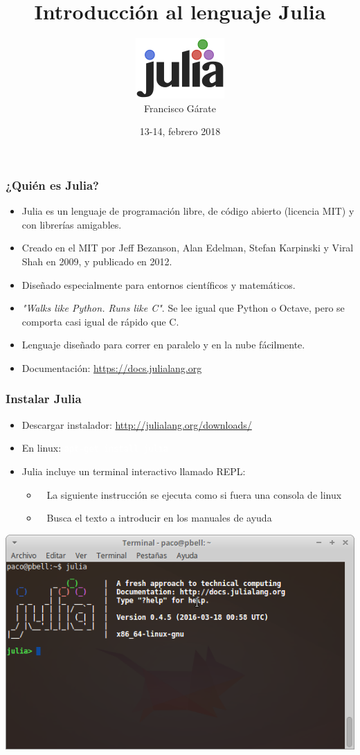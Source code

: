 \documentclass{beamer}
\title{Introducción al lenguaje Julia}
\author{\includegraphics[scale=0.5]{images/128px-Julia_prog_language}\\Francisco Gárate}
\institute{Jornadas Medialab-Prado}
\date{13-14, febrero 2018}
\providecommand{\comando}[1]{\texttt{\colorbox{morado_w}{\textcolor{white}{#1}}}}
\begin{document}
\frame{\titlepage}
 
\begin{frame}
\frametitle{¿Quién es Julia?}
\begin{itemize}
	\item Julia es un lenguaje de programación libre, de código abierto (licencia MIT) y con librerías amigables.
	\item Creado en el MIT por Jeff Bezanson, Alan Edelman, Stefan Karpinski y Viral Shah en 2009, y publicado en 2012.
	\item Diseñado especialmente para entornos científicos y matemáticos. 
	\item \textit{"Walks like Python. Runs like C"}. Se lee igual que Python o Octave, pero se comporta casi igual de rápido que C.
	\item Lenguaje diseñado para correr en paralelo y en la nube fácilmente.
	\item Documentación: \url{https://docs.julialang.org}
\end{itemize}
\end{frame}

\begin{frame}
\frametitle{Instalar Julia}
\begin{itemize}
	\item Descargar instalador: \url{http://julialang.org/downloads/}
	\item En linux: \comando{apt-get install julia}
	\item Julia incluye un terminal interactivo llamado REPL:
		\begin{itemize}
		\item \comando{;} La siguiente instrucción se ejecuta como si fuera una consola de linux
		\item \comando{?} Busca el texto a introducir en los manuales de ayuda
		\end{itemize}
\end{itemize}
\begin{center}
	\includegraphics[scale=0.35]{images/julia-consola}
\end{center}
\end{frame}
\end{document}
